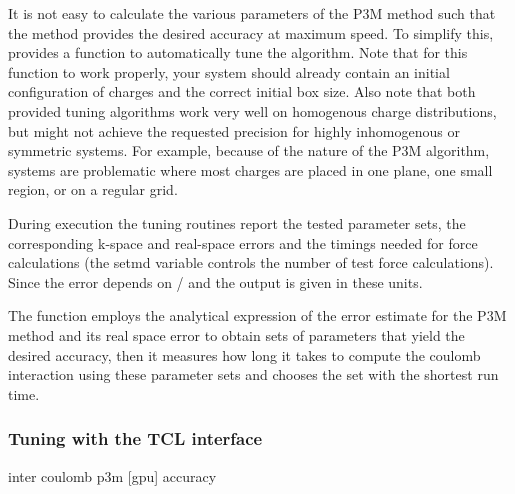 It is not easy to calculate the various parameters of the P3M method
such that the method provides the desired accuracy at maximum speed.
To simplify this, \es{} provides a function to automatically tune the
algorithm.  Note that for this function to work properly, your system
should already contain an initial configuration of charges and the
correct initial box size. Also note that both provided tuning
algorithms work very well on homogenous charge distributions, but
might not achieve the requested precision for highly inhomogenous or
symmetric systems. For example, because of the nature of the P3M
algorithm, systems are problematic where most charges are placed in
one plane, one small region, or on a regular grid.

During execution the tuning routines report the tested parameter sets,
the corresponding k-space and real-space errors and the timings needed
for force calculations (the setmd variable  controls the
number of test force calculations).  Since the error depends on
/ and \var{\alpha} the
output is given in these units.

The function employs the analytical expression of the error estimate
for the P3M method \cite{hockney88} and its real space error
\cite{kolafa92} to obtain sets of parameters that yield the desired
accuracy, then it measures how long it takes to compute the coulomb
interaction using these parameter sets and chooses the set with the
shortest run time.

\subsubsection{Tuning with the TCL interface}
\label{ssec:tunep3mTCL}

\begin{essyntax}
  inter coulomb  p3m [gpu] 
  accuracy \\
  \begin{features}
  \end{features}
\end{essyntax}

